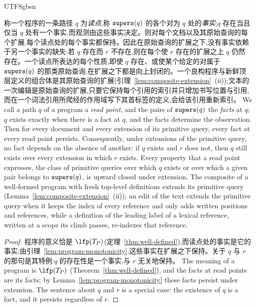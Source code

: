 \begin{CJK*}{UTF8}{gbsn}
\begin{proposition}\label{prop:upward-closed-observation}
\ifPaperChinese
称一个程序的一条路径 $q$ 为\emph{读点},称 $\mathtt{supers}(q)$ 的各个对为 $q$ 处的\emph{事实};$q$ 存在当且仅当 $q$ 处有一个事实,而观测由这些事实决定。则对每个文档以及其原始查询的每个扩展,每个读点处的每个事实都保持。因此在原始查询的扩展之下,没有事实依赖于另一个事实的缺失:若 $q$ 存在而 $r$ 不存在,则在每个使 $r$ 存在的扩展之上 $q$ 仍然存在。一个读点所表达的每个性质,即使 $q$ 存在、或使某个给定的对属于 $\mathtt{supers}(q)$ 的那类原始查询,在扩展之下都是向上封闭的。一个良构程序与新鲜顶层定义的组合体是其原始查询的扩展(引理~\ref{lem:composite-extension}~(ii));文本的一次编辑是原始查询的扩展,只要它保持每个引用的索引并只增加书写位置与引用,而在一个词法引用所爬经的作用域写下其首标签的定义,会给该引用重新索引。
\else
We call a path $q$ of a program a \emph{read point}, and the pairs of $\mathtt{supers}(q)$ the \emph{facts} at
$q$; $q$ exists exactly when there is a fact at $q$, and the facts determine the observation. Then for
every document and every extension of its primitive query, every fact at every read point persists.
Consequently, under extensions of the primitive query, no fact depends on the absence of another: if
$q$ exists and $r$ does not, then $q$ still exists over every extension in which $r$ exists. Every
property that a read point expresses, the class of primitive queries over which $q$ exists or over
which a given pair belongs to $\mathtt{supers}(q)$, is upward closed under extension. The composite of a
well-formed program with fresh top-level definitions extends its primitive query
(Lemma~\ref{lem:composite-extension}~(ii)); an edit of the text extends the primitive query
when it keeps the index of every reference and only adds written positions and references, while a
definition of the leading label of a lexical reference, written at a scope its climb passes, re-indexes
that reference.
\fi
\end{proposition}

\begin{proof}
\ifPaperChinese
程序的意义恰是 $\lfp(T_P)$(定理~\ref{thm:well-defined}),而读点处的事实是它的事实;由引理~\ref{lem:program-monotonicity},这些事实在扩展之下保持。关于 $q$ 与 $r$ 的那句是其特例:$q$ 的存在性是一个事实,与 $r$ 无关地保持。
\else
The meaning of a program is $\lfp(T_P)$ (Theorem~\ref{thm:well-defined}), and the facts at read points
are its facts; by Lemma~\ref{lem:program-monotonicity} these facts persist under extension. The sentence about
$q$ and $r$ is a special case: the existence of $q$ is a fact, and it persists regardless of $r$.
\fi
\end{proof}


\end{CJK*}
